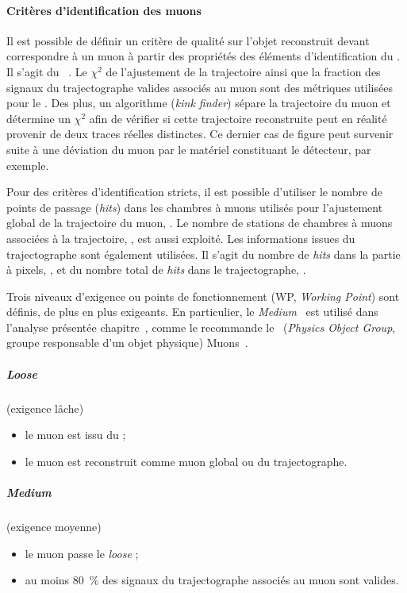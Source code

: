 \paragraph{Critères d'identification des muons}
Il est possible de définir un critère de qualité sur l'objet reconstruit devant correspondre à un muon à partir des propriétés des éléments d'identification du \PF.
Il s'agit du \muonID~\cite{CMS-MUO-16-001,cmsMediumMuon}.
Le $\chi^2$ de l'ajustement de la trajectoire ainsi que la fraction des signaux du trajectographe valides associés au muon sont des métriques utilisées pour le \muonID.
Des plus, un algorithme (\emph{kink finder}) sépare la trajectoire du muon et détermine un $\chi^2$ afin de vérifier si cette trajectoire reconstruite peut en réalité provenir de deux traces réelles distinctes.
Ce dernier cas de figure peut survenir suite à une déviation du muon par le matériel constituant le détecteur, par exemple.
\par
Pour des critères d'identification stricts, il est possible d'utiliser le nombre de points de passage (\emph{hits}) dans les chambres à muons utilisés pour l'ajustement global de la trajectoire du muon, \Nmdhits.
Le nombre de stations de chambres à muons associées à la trajectoire, \Nms, est aussi exploité.
Les informations issues du trajectographe sont également utilisées.
Il s'agit du nombre de \emph{hits} dans la partie à pixels, \Npixelhits, et du nombre total de \emph{hits} dans le trajectographe, \Ntrkhits.
\par
Trois niveaux d'exigence ou points de fonctionnement (WP, \emph{Working Point}) sont définis, de plus en plus exigeants.
En particulier, le \emph{Medium} \muonID\ est utilisé dans l'analyse présentée chapitre~, comme le recommande le \POG\ (\emph{Physics Object Group}, groupe responsable d'un objet physique) Muons~\cite{cmsMediumMuon}.
\subparagraph{\emph{Loose} \muonID} (exigence lâche)
\begin{itemize}
\item le muon est issu du \PF;
\item le muon est reconstruit comme muon global ou du trajectographe.
\end{itemize}
\subparagraph{\emph{Medium} \muonID} (exigence moyenne)
\begin{itemize}
\item le muon passe le \emph{loose} \muonID;
\item au moins \SI{80}{\%} des signaux du trajectographe associés au muon sont valides.
\end{itemize}
